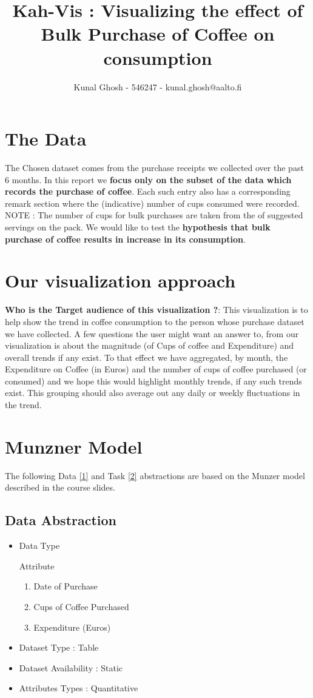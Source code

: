 \documentclass[a4paper,11pt]{article}
\begin{document}
\title{Kah-Vis : Visualizing the effect of 
	Bulk Purchase of Coffee on consumption} %
\author{Kunal Ghosh - 546247 - kunal.ghosh@aalto.fi} %
\maketitle
\begin{multicols}{2}
\section*{The Data}
The Chosen dataset comes from the purchase receipts we collected over the past 6 months. In this report we \textbf{focus only on the subset of the data which records the purchase of coffee}. Each such entry also has a corresponding remark section where the (indicative) number of cups consumed were recorded. NOTE : The number of cups for bulk purchases are taken from the of suggested servings on the pack. We would like to test the \textbf{hypothesis that bulk purchase of coffee results in increase in its consumption}.
\section*{Our visualization approach}
\textbf{Who is the Target audience of this visualization ?}: This visualization is to help show the trend in coffee consumption to the person whose purchase dataset we have collected. 
A few questions the user might want an answer to, from our visualization is about  the magnitude (of Cups of coffee and Expenditure) and overall trends if any exist.
To that effect we have aggregated, by month, the Expenditure on Coffee (in Euros) and the number of cups of coffee purchased (or consumed) and we hope this would highlight monthly trends, if any such trends exist. This grouping should also average out any daily or weekly fluctuations in the trend.
\section*{Munzner Model}
The following Data \ref{1} and Task \ref{2} abstractions are based on the Munzer model described in the course slides.
\subsection*{Data Abstraction}
\begin{itemize}
	\item Data Type
	\begin{itemize}
		Attribute
		\begin{enumerate}
			\item Date of Purchase 
			\item Cups of Coffee Purchased
			\item Expenditure (Euros)
		\end{enumerate} 
	\end{itemize}
	\item Dataset Type : Table
	\item Dataset Availability : Static
	\item Attributes Types : Quantitative
\end{itemize}

\end{multicols}
\end{document}
